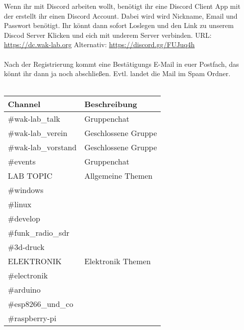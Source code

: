 Wenn ihr mit Discord arbeiten wollt, benötigt ihr eine Discord Client App mit der erstellt ihr einen Discord Account. Dabei wird wird Nickname, Email und Passwort benötigt. Ihr könnt dann sofort Loslegen und den Link zu unserem Discod Server Klicken und eich mit underem Server verbinden. URL: \url{https://dc.wak-lab.org} Alternativ: \url{https://discord.gg/FUJuq4h}\\
\ \\
Nach der Registrierung kommt eine Bestätigungs E-Mail in euer Postfach, das könnt ihr dann ja noch abschließen. Evtl. landet die Mail im Spam Ordner. \\

\ \\
\begin{raggedright}
\begin{tabular}{|p{}|p{}|}
\hline
\textbf{Channel} & \textbf{Beschreibung}\\
\hline
\#wak-lab\_talk & Gruppenchat\\
\hline
\#wak-lab\_verein & Geschlossene Gruppe\\
\hline
\#wak-lab\_vorstand & Geschlossene Gruppe\\
\hline
\#events & Gruppenchat\\
\hline
LAB TOPIC & Allgemeine Themen\\
\cline{1-1}
\#windows & \\
\cline{1-1}
\#linux & \\
\cline{1-1}
\#develop & \\
\cline{1-1}
\#funk\_radio\_sdr & \\
\cline{1-1}
\#3d-druck & \\
\hline
ELEKTRONIK & Elektronik Themen\\
\cline{1-1}
\#electronik & \\
\cline{1-1}
\#arduino & \\
\cline{1-1}
\#esp8266\_und\_co & \\
\cline{1-1}
\#raspberry-pi & \\
\hline
\end{tabular}
\label{tab:Channels}
\end{raggedright}



